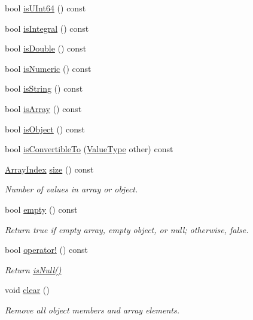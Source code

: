 \begin{DoxyCompactItemize}
bool \hyperlink{classJson_1_1Value_aa35efece2a6cba4d988d7d5b54db2fb8}{is\+U\+Int64} () const 
\item 
bool \hyperlink{classJson_1_1Value_aec4f74ef7b776b1d9c8a10fc3bb4add5}{is\+Integral} () const 
\item 
bool \hyperlink{classJson_1_1Value_a0ea567fa51fc808851698bef59b43626}{is\+Double} () const 
\item 
bool \hyperlink{classJson_1_1Value_a8ce848900e2e8fa23a41fcc2c1409fab}{is\+Numeric} () const 
\item 
bool \hyperlink{classJson_1_1Value_a06c01d7c1e8151a5844b595ab00f46c7}{is\+String} () const 
\item 
bool \hyperlink{classJson_1_1Value_ac8c898f93543e55b67418f94bced20af}{is\+Array} () const 
\item 
bool \hyperlink{classJson_1_1Value_a80cffaa0402b80317c0437216bbb6d92}{is\+Object} () const 
\item 
bool \hyperlink{classJson_1_1Value_a7ec153803631a27abf58cba2bb1af70c}{is\+Convertible\+To} (\hyperlink{namespaceJson_a7d654b75c16a57007925868e38212b4e}{Value\+Type} other) const 
\item 
\hyperlink{classJson_1_1Value_a184a91566cccca7b819240f0d5561c7d}{Array\+Index} \hyperlink{classJson_1_1Value_a4ca8ee6c48a34ca6c2f131956bab5e05}{size} () const 
\begin{DoxyCompactList}\small\item\em Number of values in array or object. \end{DoxyCompactList}\item 
bool \hyperlink{classJson_1_1Value_a99c42d3ff8495dad1e91b43e66553c36}{empty} () const 
\begin{DoxyCompactList}\small\item\em Return true if empty array, empty object, or null; otherwise, false. \end{DoxyCompactList}\item 
bool \hyperlink{classJson_1_1Value_a021ab0d15a807fbe051446c9c545ab61}{operator!} () const 
\begin{DoxyCompactList}\small\item\em Return \hyperlink{classJson_1_1Value_aeb9ad8b1bb91bdd72203dc884b3f4362}{is\+Null()} \end{DoxyCompactList}\item 
void \hyperlink{classJson_1_1Value_a501a4d67e6c875255c2ecc03ccd2019b}{clear} ()
\begin{DoxyCompactList}\small\item\em Remove all object members and array elements. \end{DoxyCompactList}\item 

\end{DoxyCompactItemize}
